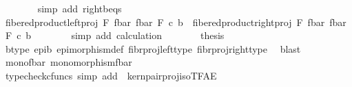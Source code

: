 \begin{isabellebody}
\ \ \ \ \ \ \isamarkupfalse%
\ {\isacharparenleft}{\kern0pt}simp\ add{\isacharcolon}{\kern0pt}\ right{\isacharunderscore}{\kern0pt}b{\isacharunderscore}{\kern0pt}eqs{\isacharparenright}{\kern0pt}\isanewline
\ \ \ \ \isamarkupfalse%
\ \isamarkupfalse%
\ {\isachardoublequoteopen}fibered{\isacharunderscore}{\kern0pt}product{\isacharunderscore}{\kern0pt}left{\isacharunderscore}{\kern0pt}proj\ F\ {\isacharparenleft}{\kern0pt}f{\isacharunderscore}{\kern0pt}bar{\isacharparenright}{\kern0pt}\ {\isacharparenleft}{\kern0pt}f{\isacharunderscore}{\kern0pt}bar{\isacharparenright}{\kern0pt}\ F\ {\isasymcirc}\isactrlsub c\ b\ {\isacharequal}{\kern0pt}\ fibered{\isacharunderscore}{\kern0pt}product{\isacharunderscore}{\kern0pt}right{\isacharunderscore}{\kern0pt}proj\ F\ {\isacharparenleft}{\kern0pt}f{\isacharunderscore}{\kern0pt}bar{\isacharparenright}{\kern0pt}\ {\isacharparenleft}{\kern0pt}f{\isacharunderscore}{\kern0pt}bar{\isacharparenright}{\kern0pt}\ F\ {\isasymcirc}\isactrlsub c\ b{\isachardoublequoteclose}\isanewline
\ \ \ \ \ \ \isamarkupfalse%
\ {\isacharparenleft}{\kern0pt}simp\ add{\isacharcolon}{\kern0pt}\ calculation{\isacharparenright}{\kern0pt}\isanewline
\ \ \ \ \isamarkupfalse%
\ \isamarkupfalse%
\ {\isacharquery}{\kern0pt}thesis\isanewline
\ \ \ \ \ \ \isamarkupfalse%
\ b{\isacharunderscore}{\kern0pt}type\ epi{\isacharunderscore}{\kern0pt}b\ epimorphism{\isacharunderscore}{\kern0pt}def{}\ fibr{\isacharunderscore}{\kern0pt}proj{\isacharunderscore}{\kern0pt}left{\isacharunderscore}{\kern0pt}type\ fibr{\isacharunderscore}{\kern0pt}proj{\isacharunderscore}{\kern0pt}right{\isacharunderscore}{\kern0pt}type\ \isamarkupfalse%
\ blast\isanewline
\ \ \isamarkupfalse%
\isanewline
\ \ \isanewline
\ \ \isamarkupfalse%
\ \isamarkupfalse%
\ mono{\isacharunderscore}{\kern0pt}fbar{\isacharcolon}{\kern0pt}\ {\isachardoublequoteopen}monomorphism{\isacharparenleft}{\kern0pt}f{\isacharunderscore}{\kern0pt}bar{\isacharparenright}{\kern0pt}{\isachardoublequoteclose}\isanewline
\ \ \ \ \isamarkupfalse%
\ {\isacharparenleft}{\kern0pt}typecheck{\isacharunderscore}{\kern0pt}cfuncs{\isacharcomma}{\kern0pt}\ simp\ add{\isacharcolon}{\kern0pt}\ \ kern{\isacharunderscore}{\kern0pt}pair{\isacharunderscore}{\kern0pt}proj{\isacharunderscore}{\kern0pt}iso{\isacharunderscore}{\kern0pt}TFAE{}{\isacharparenright}{\kern0pt}\isanewline
\ \ \isanewline
\ \ \isamarkupfalse%

\end{isabellebody}
